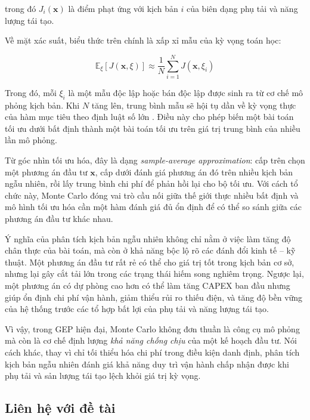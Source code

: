 \noindent trong đó $J_i(\mathbf{x})$ là điểm phạt ứng với kịch bản $i$ của biên dạng phụ tải và năng lượng tái tạo.

Về mặt xác suất, biểu thức trên chính là xấp xỉ mẫu của kỳ vọng toán học:

\begin{equation}
    \mathbb{E}_{\xi}[J(\mathbf{x}, \xi)] \approx \frac{1}{N} \sum_{i=1}^{N} J(\mathbf{x}, \xi_i)
    \label{eq:mc_expectation}
\end{equation}

Trong đó, mỗi $\xi_i$ là một mẫu độc lập hoặc bán độc lập được sinh ra từ cơ chế mô phỏng kịch bản. Khi $N$ tăng lên, trung bình mẫu sẽ hội tụ dần về kỳ vọng thực của hàm mục tiêu theo định luật số lớn \cite{rubinstein2016monte_carlo}. Điều này cho phép biến một bài toán tối ưu dưới bất định thành một bài toán tối ưu trên giá trị trung bình của nhiều lần mô phỏng.

Từ góc nhìn tối ưu hóa, đây là dạng \textit{sample-average approximation}: cấp trên chọn một phương án đầu tư $\mathbf{x}$, cấp dưới đánh giá phương án đó trên nhiều kịch bản ngẫu nhiên, rồi lấy trung bình chi phí để phản hồi lại cho bộ tối ưu. Với cách tổ chức này, Monte Carlo đóng vai trò cầu nối giữa thế giới thực nhiều bất định và mô hình tối ưu hóa cần một hàm đánh giá đủ ổn định để có thể so sánh giữa các phương án đầu tư khác nhau.

Ý nghĩa của phân tích kịch bản ngẫu nhiên không chỉ nằm ở việc làm tăng độ chân thực của bài toán, mà còn ở khả năng bộc lộ rõ các đánh đổi kinh tế -- kỹ thuật. Một phương án đầu tư rất rẻ có thể cho giá trị tốt trong kịch bản cơ sở, nhưng lại gây cắt tải lớn trong các trạng thái hiếm song nghiêm trọng. Ngược lại, một phương án có dự phòng cao hơn có thể làm tăng CAPEX ban đầu nhưng giúp ổn định chi phí vận hành, giảm thiểu rủi ro thiếu điện, và tăng độ bền vững của hệ thống trước các tổ hợp bất lợi của phụ tải và năng lượng tái tạo.

Vì vậy, trong GEP hiện đại, Monte Carlo không đơn thuần là công cụ mô phỏng mà còn là cơ chế định lượng \textit{khả năng chống chịu} của một kế hoạch đầu tư. Nói cách khác, thay vì chỉ tối thiểu hóa chi phí trong điều kiện danh định, phân tích kịch bản ngẫu nhiên đánh giá khả năng duy trì vận hành chấp nhận được khi phụ tải và sản lượng tái tạo lệch khỏi giá trị kỳ vọng.

\subsection{Liên hệ với đề tài}

